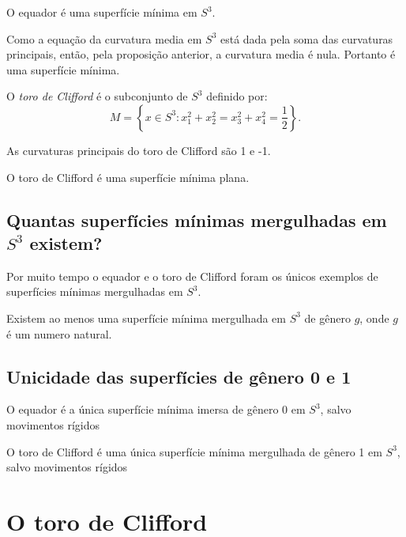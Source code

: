 \begin{corolario}
	O equador é uma superfície mínima em $S^3$.
\end{corolario}

\begin{demonstracao}
	Como a equação da curvatura media em $S^3$ está dada pela soma das curvaturas principais, então, pela proposição anterior, a curvatura media é nula. Portanto é uma superfície mínima.
\end{demonstracao}

\begin{definicao}
	O \emph{toro de Clifford} é o subconjunto de $S^3$ definido por:
	\begin{equation*}
	M = \left\{ x \in S^3: x_1^2 + x_2^2 = x_3^2 + x_4^2 = \frac{1}{2} \right\}.
	\end{equation*}
\end{definicao}

\begin{proposicao}
	As curvaturas principais do toro de Clifford são 1 e -1.
\end{proposicao}

\begin{proposicao}
	O toro de Clifford é uma superfície mínima plana.
\end{proposicao}

\subsection{Quantas superfícies mínimas mergulhadas em $S^3$ existem?}

\begin{observacao}
	Por muito tempo o equador e o toro de Clifford foram os únicos exemplos de superfícies mínimas mergulhadas em $S^3$.
\end{observacao}

\begin{teorema}[Lawson]
	Existem ao menos uma superfície mínima mergulhada em $S^3$ de gênero $g$, onde $g$ é um numero natural.
\end{teorema}


\subsection{Unicidade das superfícies de gênero 0 e 1}

\begin{teorema}[Almgren]
	O equador é a única superfície mínima imersa de gênero 0 em $S^3$, salvo movimentos rígidos
\end{teorema}

\begin{observacao}
	O toro de Clifford é uma única superfície mínima mergulhada de gênero 1 em $S^3$, salvo movimentos rígidos
\end{observacao}

\section{O toro de Clifford}